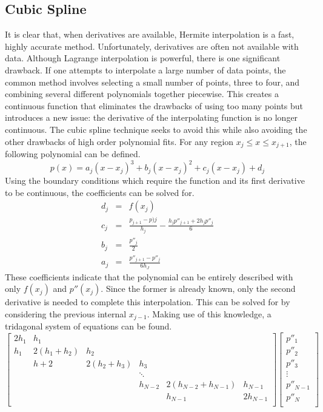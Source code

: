 \documentclass[12pt]{article}
\begin{document}
\subsection{Cubic Spline}
It is clear that, when derivatives are available, Hermite interpolation is a fast, highly accurate method.  Unfortunately, derivatives are often not available with data.  Although Lagrange interpolation is powerful, there is one significant drawback.  If one attempts to interpolate a large number of data points, the common method involves selecting a small number of points, three to four, and combining several different polynomials together piecewise.  This creates a continuous function that eliminates the drawbacks of using too many points but introduces a new issue:  the derivative of the interpolating function is no longer continuous.  
The cubic spline technique seeks to avoid this while also avoiding the other drawbacks of high order polynomial fits.  For any region $x_j \leq x \leq x_{j+1}$, the following polynomial can be defined.
\begin{equation}
\label{Pspline}
p(x) = a_j(x-x_j)^3+b_j(x-x_j)^2+c_j(x-x_j)+d_j
\end{equation}
Using the boundary conditions which require the function and its first derivative to be continuous, the coefficients can be solved for.
\begin{eqnarray}
\label{SplineCoeff}
d_j &=& f(x_j) \nonumber \\
c_j &=& \frac{p_{j+1}-p)j}{h_j} - \frac{h_j p''_{j+1} + 2h_j p''_j}{6} \nonumber \\
b_j &=& \frac{p''_j}{2} \nonumber \\
a_j &=& \frac{p''_{j+1}-p''_j}{6 h_J}
\end{eqnarray}
These coefficients indicate that the polynomial can be entirely described with only $f(x_j)$ and $p''(x_j)$.  Since the former is already known, only the second derivative is needed to complete this interpolation.  This can be solved for by considering the previous internal $x_{j-1}$.  Making use of this knowledge, a tridagonal system of equations can be found.
\[
\begin{bmatrix}
2h_1 & h_1 & & & & \\
h_1 & 2(h_1+h_2) & h_2 & & & \\
 & h+2 & 2(h_2+h_3) & h_3 & & \\
 & & & \ddots & & \\
 & & & h_{N-2} & 2(h_{N-2} + h_{N-1})& h_{N-1} \\
 & & & & h_{N-1} & 2h_{N-1} \\  
\end{bmatrix}
\begin{bmatrix}
p''_1\\
p''_2\\
p''_3\\
\vdots \\
p''_{N-1} \\
p''_N \\ 
\end{bmatrix} \]
\end{document}
